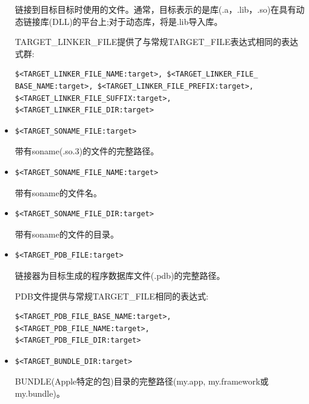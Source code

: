 \begin{itemize}
链接到目标目标时使用的文件。通常，目标表示的是库(.a，.lib，.so)在具有动态链接库(DLL)的平台上;对于动态库，将是.lib导入库。

TARGET\_LINKER\_FILE提供了与常规TARGET\_FILE表达式相同的表达式群:

\begin{lstlisting}[style=styleCMake]
$<TARGET_LINKER_FILE_NAME:target>, $<TARGET_LINKER_FILE_
BASE_NAME:target>, $<TARGET_LINKER_FILE_PREFIX:target>,
$<TARGET_LINKER_FILE_SUFFIX:target>,
$<TARGET_LINKER_FILE_DIR:target>
\end{lstlisting}

\item 
\begin{lstlisting}[style=styleCMake]
$<TARGET_SONAME_FILE:target>
\end{lstlisting}

带有soname(.so.3)的文件的完整路径。

\item 
\begin{lstlisting}[style=styleCMake]
$<TARGET_SONAME_FILE_NAME:target>
\end{lstlisting}

带有soname的文件名。

\item 
\begin{lstlisting}[style=styleCMake]
$<TARGET_SONAME_FILE_DIR:target> 
\end{lstlisting}

带有soname的文件的目录。

\item 
\begin{lstlisting}[style=styleCMake]
$<TARGET_PDB_FILE:target>
\end{lstlisting}

链接器为目标生成的程序数据库文件(.pdb)的完整路径。

PDB文件提供与常规TARGET\_FILE相同的表达式:

\begin{lstlisting}[style=styleCMake]
$<TARGET_PDB_FILE_BASE_NAME:target>, $<TARGET_PDB_FILE_NAME:target>,
$<TARGET_PDB_FILE_DIR:target>
\end{lstlisting}

\item 
\begin{lstlisting}[style=styleCMake]
$<TARGET_BUNDLE_DIR:target> 
\end{lstlisting}

BUNDLE(Apple特定的包)目录的完整路径(my.app, my.framework或my.bundle)。


\end{itemize}
